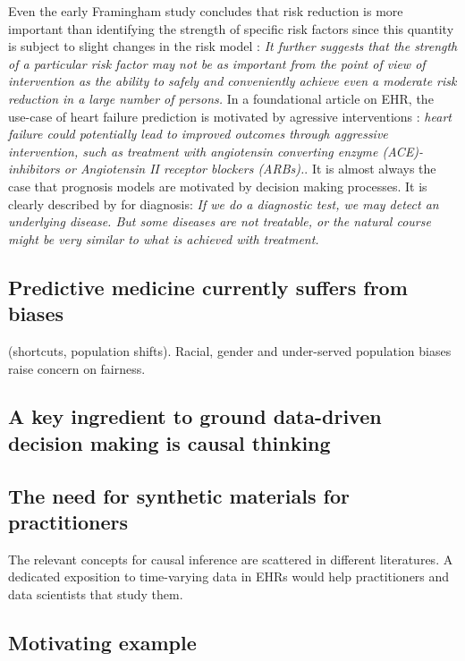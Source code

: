 \documentclass[french,12pt,twoside,a4paper]{book}
\begin{document}
Even the early Framingham study concludes that risk reduction is more important
than identifying the strength of specific risk factors since this quantity is
subject to slight changes in the risk model \citep{brand1976multivariate}:
\textit{It further suggests that the strength of a particular risk factor may
  not be as important from the point of view of intervention as the ability to
  safely and conveniently achieve even a moderate risk reduction in a large number
  of persons.}
In a foundational article on EHR, the use-case of heart failure prediction is
motivated by agressive interventions \citep{wu2010prediction}: \textit{heart
  failure could potentially lead to improved outcomes through aggressive
  intervention, such as treatment with angiotensin converting enzyme
  (ACE)-inhibitors or Angiotensin II receptor blockers (ARBs).}. It is almost
always the case that prognosis models are motivated by decision making
processes. It is clearly described by \cite{steyerberg2009applications} for
diagnosis: \textit{If we do a diagnostic test, we may detect an underlying
  disease. But some diseases are not treatable, or the natural course might be
  very similar to what is achieved with treatment.}

\subsection{Predictive medicine currently suffers from biases}%
\label{subsec:causal_tuto:predictive_medicine_biases}%
(shortcuts,
population shifts). Racial, gender and under-served population biases raise
concern on fairness.

\subsection{A key ingredient to ground data-driven decision making is causal thinking}\label{subsec:causal_tuto:causal_thinking}

\subsection{The need for synthetic materials for practitioners}%
\label{subsec:causal_tuto:synthetic_materials}%

The relevant concepts for causal inference are scattered in different literatures. A dedicated exposition to time-varying data in EHRs would help practitioners and data scientists that study them.
\subsection{Motivating example}\label{subsec:causal_tuto:motivating_example}
\end{document}

